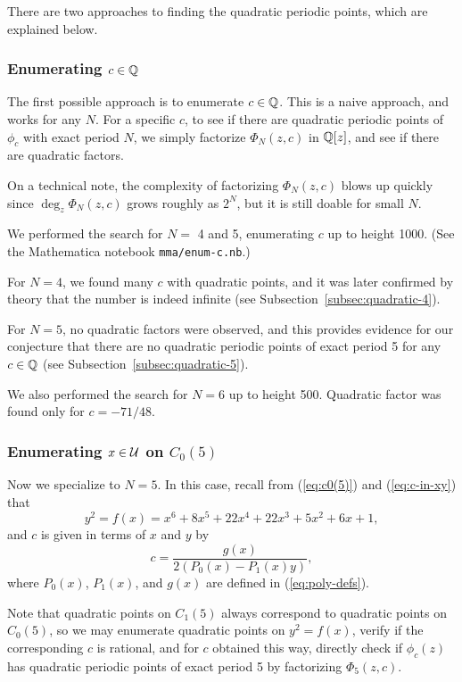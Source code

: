 There are two approaches to finding the quadratic periodic points,
which are explained below.

\subsubsection{Enumerating $c \in \mathbb{Q}$}

The first possible approach is to enumerate $c \in \mathbb{Q}$. This is a
naive approach, and works for any $N$. For a specific $c$, to see if
there are quadratic periodic points of $\phi_c$ with exact period $N$,
we simply factorize $\Phi_N(z, c)$ in $\mathbb{Q}[z]$, and see if there are
quadratic factors.

On a technical note, the complexity of factorizing $\Phi_N(z, c)$
blows up quickly since $\deg_z \Phi_N(z, c)$ grows roughly as $2^N$,
but it is still doable for small $N$.

We performed the search for $N =$ 4 and 5, enumerating $c$ up to
height 1000. (See the Mathematica notebook \texttt{mma/enum-c.nb}.)

For $N = 4$, we found many $c$ with quadratic points, and it was later
confirmed by theory that the number is indeed infinite (see
Subsection~\ref{subsec:quadratic-4}).

For $N=5$, no quadratic factors were observed, and this provides
evidence for our conjecture that there are no quadratic periodic
points of exact period 5 for any $c \in \mathbb{Q}$ (see
Subsection~\ref{subsec:quadratic-5}).

We also performed the search for $N = 6$ up to height 500. Quadratic
factor was found only for $c = -71/48$.

\subsubsection{Enumerating $x \in \mathcal{U}$ on $C_0(5)$}

Now we specialize to $N = 5$. In this case, recall from
(\ref{eq:c0(5)}) and (\ref{eq:c-in-xy}) that
\[
y^2 = f(x) = x^6 + 8x^5 + 22x^4 + 22x^3 + 5x^2 + 6x + 1,
\]
and $c$ is given in terms of $x$ and $y$ by
\[
c = \frac{g(x)}{2(P_0(x) - P_1(x) y)},
\]
where $P_0(x)$, $P_1(x)$, and $g(x)$ are defined in
(\ref{eq:poly-defs}).

Note that quadratic points on $C_1(5)$ always correspond to quadratic
points on $C_0(5)$, so we may enumerate quadratic points on $y^2 =
f(x)$, verify if the corresponding $c$ is rational, and for $c$
obtained this way, directly check if $\phi_c(z)$ has quadratic
periodic points of exact period 5 by factorizing $\Phi_5(z, c)$.

